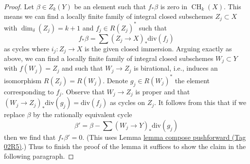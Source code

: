 \documentclass{amsart}
\theoremstyle{plain}
\theoremstyle{definition}
\theoremstyle{remark}
\numberwithin{equation}{subsection}
\def\CH{\mathop{\mathrm{CH}}\nolimits}
\begin{document}
\begin{proof}
\medskip\noindent
Let $\beta \in Z_k(Y)$ be an element such that $f_*\beta$ is zero in
$\CH_k(X)$. This means we can find a locally finite family of
integral closed subschemes $Z_j \subset X$ with $\dim_\delta(Z_j) = k + 1$
and $f_j \in R(Z_j)^*$ such that
$$
f_*\beta = \sum (Z_j \to X)_*\text{div}(f_j)
$$
as cycles where $i_j : Z_j \to X$ is the given closed immersion.
Arguing exactly as above, we can find a locally finite
family of integral closed subschemes $W_j \subset Y$
with $f(W_j) = Z_j$ and such that $W_j \to Z_j$ is birational, i.e.,
induces an isomorphism $R(Z_j) = R(W_j)$. Denote $g_j \in R(W_j)^*$
the element corresponding to $f_j$. Observe that $W_j \to Z_j$
is proper and that $(W_j \to Z_j)_*\text{div}(g_j) = \text{div}(f_j)$
as cycles on $Z_j$. It follows from this that if we replace
$\beta$ by the rationally equivalent cycle
$$
\beta' = \beta - \sum (W_j \to Y)_*\text{div}(g_j)
$$
then we find that $f_*\beta' = 0$.
(This uses Lemma \href{https://stacks.math.columbia.edu/tag/02R5}{lemma compose pushforward (Tag 02R5)}.)
Thus to finish the proof
of the lemma it suffices to show the claim in the following paragraph.


\end{proof}
\end{document}
